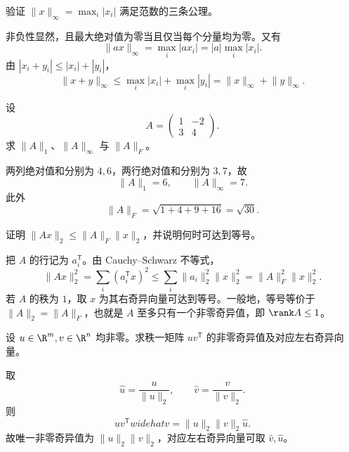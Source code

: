 %
%

\begin{exercise}[level=basic]
验证 $\lVert x\rVert_\infty=\max_i|x_i|$ 满足范数的三条公理。
\begin{solution}
非负性显然，且最大绝对值为零当且仅当每个分量均为零。又有
\[
\lVert ax\rVert_\infty=\max_i|ax_i|=|a|\max_i|x_i|.
\]
由 $|x_i+y_i|\le|x_i|+|y_i|$，
\[
\lVert x+y\rVert_\infty
\le\max_i|x_i|+\max_i|y_i|
=\lVert x\rVert_\infty+\lVert y\rVert_\infty.
\]
\end{solution}
\end{exercise}

\begin{exercise}[level=basic]
设
\[
A=\begin{pmatrix}1&-2\\3&4\end{pmatrix}.
\]
求 $\lVert A\rVert_1$、$\lVert A\rVert_\infty$ 与 $\lVert A\rVert_F$。
\begin{solution}
两列绝对值和分别为 $4,6$，两行绝对值和分别为 $3,7$，故
\[
\lVert A\rVert_1=6,
\qquad
\lVert A\rVert_\infty=7.
\]
此外
\[
\lVert A\rVert_F=\sqrt{1+4+9+16}=\sqrt{30}.
\]
\end{solution}
\end{exercise}

\begin{exercise}[level=basic]
证明 $\lVert Ax\rVert_2\le\lVert A\rVert_F\lVert x\rVert_2$，并说明何时可达到等号。
\begin{solution}
把 $A$ 的行记为 $a_i^{\mathsf T}$。由 Cauchy--Schwarz 不等式，
\[
\lVert Ax\rVert_2^2
=\sum_i(a_i^{\mathsf T}x)^2
\le\sum_i\lVert a_i\rVert_2^2\lVert x\rVert_2^2
=\lVert A\rVert_F^2\lVert x\rVert_2^2.
\]
若 $A$ 的秩为 $1$，取 $x$ 为其右奇异向量可达到等号。一般地，等号等价于
$\lVert A\rVert_2=\lVert A\rVert_F$，也就是 $A$ 至多只有一个非零奇异值，即 $\rank A\le1$。
\end{solution}
\end{exercise}

\begin{exercise}[level=basic]
设 $u\in\R^m,v\in\R^n$ 均非零。求秩一矩阵 $uv^{\mathsf T}$ 的非零奇异值及对应左右奇异向量。
\begin{solution}
取
\[
\widehat u=\frac u{\lVert u\rVert_2},
\qquad
\widehat v=\frac v{\lVert v\rVert_2}.
\]
则
\[
uv^{\mathsf T}widehat v
=\lVert u\rVert_2\lVert v\rVert_2\widehat u.
\]
故唯一非零奇异值为 $\lVert u\rVert_2\lVert v\rVert_2$，对应左右奇异向量可取 $\widehat v,\widehat u$。
\end{solution}
\end{exercise}

